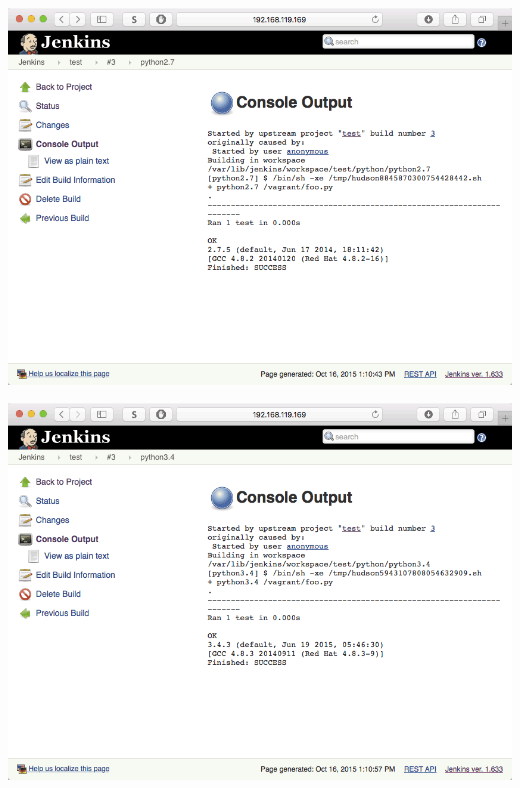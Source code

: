 \documentclass[xcolor=svgnames,17pt]{beamer}
\begin{document}
\begin{frame}[plain]{}
\includegraphics[width=\paperwidth,frame,center]{hello-6-output-1.png}
\end{frame}

\begin{frame}[plain]{}
\includegraphics[width=\paperwidth,frame,center]{hello-7-output-2.png}
\end{frame}
\end{document}
